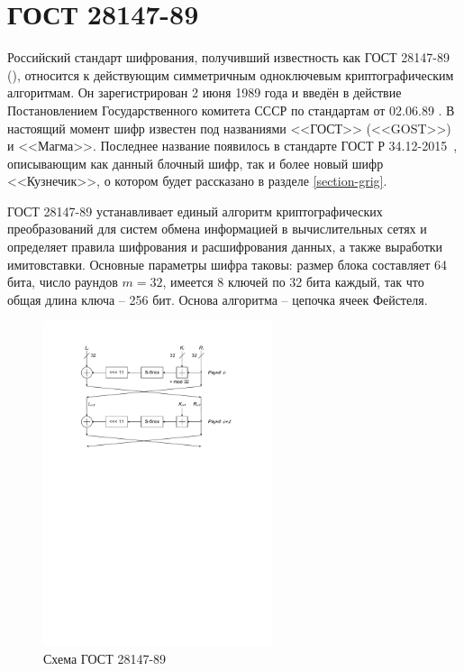 \section{ГОСТ 28147-89}

Российский стандарт шифрования, получивший известность как ГОСТ 28147-89 (\cite{GOST-89}), относится к действующим симметричным одноключевым криптографическим алгоритмам. Он зарегистрирован 2 июня 1989 года и введён в действие Постановлением Государственного комитета СССР по стандартам от 02.06.89 . В настоящий момент шифр известен под названиями <<ГОСТ>> (<<GOST>>) и <<Магма>>. Последнее название появилось в стандарте ГОСТ Р 34.12-2015~\cite{GOST-R:34.12-2015}, описывающим как данный блочный шифр, так и более новый шифр <<Кузнечик>>, о котором будет рассказано в разделе \ref{section-grig}.

ГОСТ 28147-89 устанавливает единый алгоритм криптографических преобразований для систем обмена информацией в вычислительных сетях и определяет правила шифрования и расшифрования данных, а также выработки имитовставки. Основные параметры шифра таковы: размер блока составляет 64 бита, число раундов $m=32$, имеется 8 ключей по 32 бита каждый, так что общая длина ключа -- 256 бит. Основа алгоритма -- цепочка ячеек Фейстеля.

\begin{figure}[!ht]
    \centering
    \includegraphics[width=0.6\textwidth]{pic/gost-28147-89}
    \caption{Схема ГОСТ 28147-89\label{fig:gost-28147-89}}
\end{figure}

